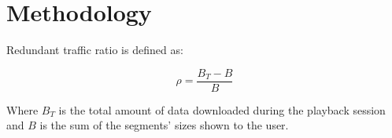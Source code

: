 
\section{Methodology}

\label{sec:sysmodel}

Redundant traffic ratio is defined as:

\begin{equation}
	\rho = \frac{B_T-B}{B}
\end{equation}

Where $B_T$ is the total amount of data downloaded during the playback session and $B$ is the sum of the segments' sizes shown to the user.



